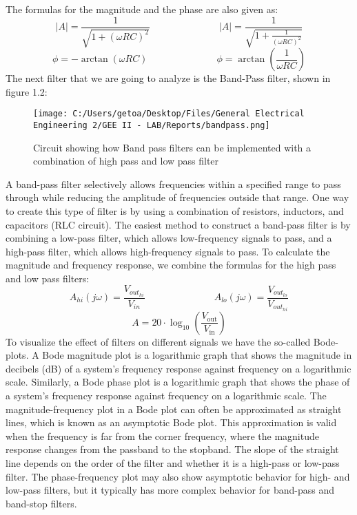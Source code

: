 \documentclass[12pt]{report}
\begin{document}
The formulas for the magnitude and the phase are also given as:
$$|A| = \frac{1}{\sqrt{1 + (\omega RC)^2}} \hspace{3cm} |A| = \frac{1}{\sqrt{1 + \frac{1}{(\omega RC)^2}}} $$
$$\phi = -\arctan(\omega RC) \hspace{3cm} \phi = \arctan(\frac{1}{\omega RC})$$
The next filter that we are going to analyze is the Band-Pass filter, shown in figure 1.2:
\begin{figure}[!htp]
  \centering
  \texttt{[image: C:/Users/getoa/Desktop/Files/General Electrical Engineering 2/GEE II - LAB/Reports/bandpass.png]}
  \caption{Circuit showing how Band pass filters can be implemented with a combination of high pass and low pass filter}
\end{figure}
A band-pass filter selectively allows frequencies within a specified range to pass through while reducing the amplitude of frequencies outside that range. One way to create this type of filter is by using a combination of resistors, inductors, and capacitors (RLC circuit). The easiest method to construct a band-pass filter is by combining a low-pass filter, which allows low-frequency signals to pass, and a high-pass filter, which allows high-frequency signals to pass. To calculate the magnitude and frequency response, we combine the formulas for the high pass and low pass filters:
$$A_{hi}(j\omega) = \frac{V_{out_{hi}}}{V_{in}} \hspace{3cm} A_{lo}(j\omega) = \frac{V_{out_{lo}}}{V_{out_{hi}}}$$
\begin{equation}
A = 20 \cdot \log_{10} \left( \frac{V_{\text{out}}}{V_{\text{in}}} \right)
\end{equation}
To visualize the effect of filters on different signals we have the so-called Bode-plots. A Bode magnitude plot is a logarithmic graph that shows the magnitude in decibels (dB) of a system's frequency response against frequency on a logarithmic scale. Similarly, a Bode phase plot is a logarithmic graph that shows the phase of a system's frequency response against frequency on a logarithmic scale. The magnitude-frequency plot in a Bode plot can often be approximated as straight lines, which is known as an asymptotic Bode plot. This approximation is valid when the frequency is far from the corner frequency, where the magnitude response changes from the passband to the stopband. The slope of the straight line depends on the order of the filter and whether it is a high-pass or low-pass filter. The phase-frequency plot may also show asymptotic behavior for high- and low-pass filters, but it typically has more complex behavior for band-pass and band-stop filters. \\
\end{document}
